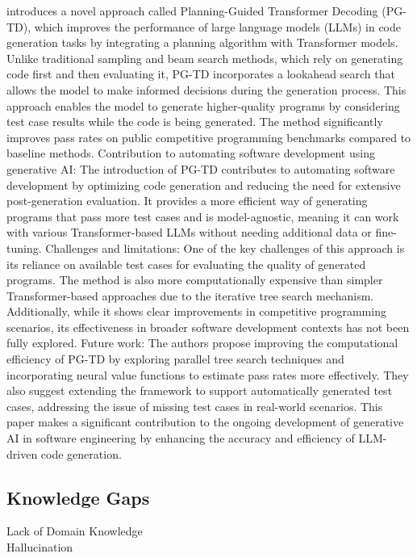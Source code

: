 \citep{zhang2023planning} introduces a novel approach called Planning-Guided Transformer Decoding (PG-TD), which improves the performance of large language models (LLMs) in code generation tasks by integrating a planning algorithm with Transformer models. Unlike traditional sampling and beam search methods, which rely on generating code first and then evaluating it, PG-TD incorporates a lookahead search that allows the model to make informed decisions during the generation process. This approach enables the model to generate higher-quality programs by considering test case results while the code is being generated. The method significantly improves pass rates on public competitive programming benchmarks compared to baseline methods.
Contribution to automating software development using generative AI: The introduction of PG-TD contributes to automating software development by optimizing code generation and reducing the need for extensive post-generation evaluation. It provides a more efficient way of generating programs that pass more test cases and is model-agnostic, meaning it can work with various Transformer-based LLMs without needing additional data or fine-tuning. 
Challenges and limitations: One of the key challenges of this approach is its reliance on available test cases for evaluating the quality of generated programs. The method is also more computationally expensive than simpler Transformer-based approaches due to the iterative tree search mechanism. Additionally, while it shows clear improvements in competitive programming scenarios, its effectiveness in broader software development contexts has not been fully explored. Future work: The authors propose improving the computational efficiency of PG-TD by exploring parallel tree search techniques and incorporating neural value functions to estimate pass rates more effectively. They also suggest extending the framework to support automatically generated test cases, addressing the issue of missing test cases in real-world scenarios. This paper makes a significant contribution to the ongoing development of generative AI in software engineering by enhancing the accuracy and efficiency of LLM-driven code generation.

\subsection{Knowledge Gaps}

\begin{description} 
   \item[Lack of Domain Knowledge] 
   \item[Hallucination] 
\end{description}